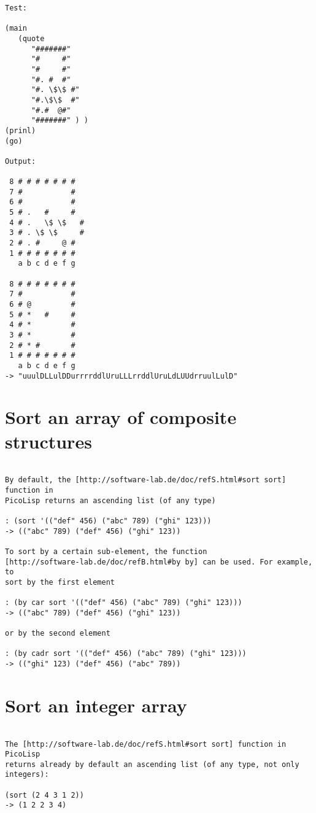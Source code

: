 \begin{verbatim}
Test:

(main
   (quote
      "#######"
      "#     #"
      "#     #"
      "#. #  #"
      "#. \$\$ #"
      "#.\$\$  #"
      "#.#  @#"
      "#######" ) )
(prinl)
(go)

Output:

 8 # # # # # # #
 7 #           #
 6 #           #
 5 # .   #     #
 4 # .   \$ \$   #
 3 # . \$ \$     #
 2 # . #     @ #
 1 # # # # # # #
   a b c d e f g

 8 # # # # # # #
 7 #           #
 6 # @         #
 5 # *   #     #
 4 # *         #
 3 # *         #
 2 # * #       #
 1 # # # # # # #
   a b c d e f g
-> "uuulDLLulDDurrrrddlUruLLLrrddlUruLdLUUdrruulLulD"

\end{verbatim}

\section*{Sort an array of composite structures}

\begin{verbatim}

By default, the [http://software-lab.de/doc/refS.html#sort sort] function in
PicoLisp returns an ascending list (of any type)

: (sort '(("def" 456) ("abc" 789) ("ghi" 123)))
-> (("abc" 789) ("def" 456) ("ghi" 123))

To sort by a certain sub-element, the function
[http://software-lab.de/doc/refB.html#by by] can be used. For example, to
sort by the first element

: (by car sort '(("def" 456) ("abc" 789) ("ghi" 123)))
-> (("abc" 789) ("def" 456) ("ghi" 123))

or by the second element

: (by cadr sort '(("def" 456) ("abc" 789) ("ghi" 123)))
-> (("ghi" 123) ("def" 456) ("abc" 789))

\end{verbatim}

\section*{Sort an integer array}

\begin{verbatim}

The [http://software-lab.de/doc/refS.html#sort sort] function in PicoLisp
returns already by default an ascending list (of any type, not only integers):

(sort (2 4 3 1 2))
-> (1 2 2 3 4)

\end{verbatim}

